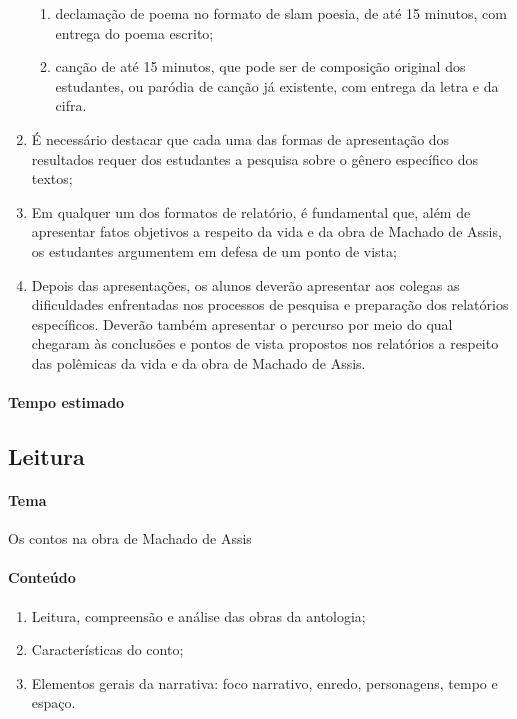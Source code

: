 \documentclass[11pt]{extarticle}
\begin{document}
\begin{enumerate}
\begin{enumerate}
\item declamação de poema no formato de slam poesia, de até 15 minutos, com
entrega do poema escrito;

\item canção de até 15 minutos, que pode ser de composição original dos
estudantes, ou paródia de canção já existente, com entrega da letra e da
cifra.
\end{enumerate}

\item
É necessário destacar que cada uma das formas de apresentação dos
resultados requer dos estudantes a pesquisa sobre o gênero específico
dos textos;

\item
Em qualquer um dos formatos de relatório, é fundamental que, além de
apresentar fatos objetivos a respeito da vida e da obra de Machado de
Assis, os estudantes argumentem em defesa de um ponto de vista;

\item
Depois das apresentações, os alunos deverão apresentar aos colegas as
dificuldades enfrentadas nos processos de pesquisa e preparação dos
relatórios específicos. Deverão também apresentar o percurso por meio do
qual chegaram às conclusões e pontos de vista propostos nos relatórios a
respeito das polêmicas da vida e da obra de Machado de Assis.
\end{enumerate}

\paragraph{Tempo estimado}

\subsection{Leitura}

%

\paragraph{Tema} Os contos na obra de Machado de Assis

\paragraph{Conteúdo} 
\begin{enumerate}
\item
Leitura, compreensão e análise das obras da
antologia; 
\item
Características do conto; 
\item
Elementos gerais da
narrativa: foco narrativo, enredo, personagens, tempo e espaço.
\end{enumerate}
\end{document}
